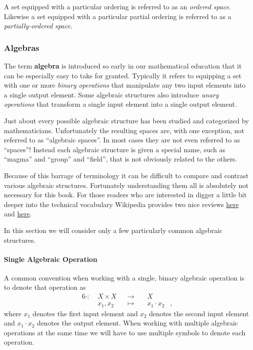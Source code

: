 \documentclass[
  letterpaper,
  DIV=11,
  numbers=noendperiod]{scrartcl}
\let\oldparagraph\paragraph
\renewcommand{\paragraph}[1]{\oldparagraph{#1}\mbox{}}
\begin{document}
A set equipped with a particular ordering is referred to as an
\emph{ordered space}. Likewise a set equipped with a particular partial
ordering is referred to as a \emph{partially-ordered space}.

\hypertarget{algebras}{%
\subsubsection{Algebras}\label{algebras}}

The term \textbf{algebra} is introduced so early in our mathematical
education that it can be especially easy to take for granted. Typically
it refers to equipping a set with one or more \emph{binary operations}
that manipulate any two input elements into a single output element.
Some algebraic structures also introduce \emph{unary operations} that
transform a single input element into a single output element.

Just about every possible algebraic structure has been studied and
categorized by mathematicians. Unfortunately the resulting spaces are,
with one exception, not referred to as ``algebraic spaces''. In most
cases they are not even referred to as ``spaces''! Instead each
algebraic structure is given a special name, such as ``magma'' and
``group'' and ``field'', that is not obviously related to the others.

Because of this barrage of terminology it can be difficult to compare
and contrast various algebraic structures. Fortunately understanding
them all is absolutely not necessary for this book. For those readers
who are interested in digger a little bit deeper into the technical
vocabulary Wikipedia provides two nice reviews
\href{https://en.wikipedia.org/wiki/Algebraic_structure\#Common_algebraic_structures}{here}
and
\href{https://en.wikipedia.org/wiki/Outline_of_algebraic_structures\#Types_of_algebraic_structures}{here}.

In this section we will consider only a few particularly common
algebraic structures.

\hypertarget{single-algebraic-operation}{%
\paragraph{Single Algebraic
Operation}\label{single-algebraic-operation}}

A common convention when working with a single, binary algebraic
operation is to denote that operation as \begin{alignat*}{6}
\cdot :\; & X \times X& &\rightarrow& \; & X &
\\
& x_{1}, x_{2} & &\mapsto& & x_{1} \cdot x_{2} &,
\end{alignat*} where \(x_{1}\) denotes the first input element and
\(x_{2}\) denotes the second input element and \(x_{1} \cdot x_{2}\)
denotes the output element. When working with multiple algebraic
operations at the same time we will have to use multiple symbols to
denote each operation.
\end{document}
